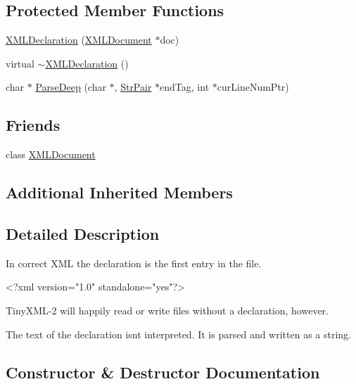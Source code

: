 \subsection*{Protected Member Functions}
\begin{DoxyCompactItemize}
\item 
\hyperlink{classtinyxml2_1_1_x_m_l_declaration_aef9586f2ce5df5feba74dde49a242b06}{X\+M\+L\+Declaration} (\hyperlink{classtinyxml2_1_1_x_m_l_document}{X\+M\+L\+Document} $\ast$doc)
\item 
virtual \hyperlink{classtinyxml2_1_1_x_m_l_declaration_ab93d5bf4f5d58b4144963cf739cf6dcc}{$\sim$\+X\+M\+L\+Declaration} ()
\item 
char $\ast$ \hyperlink{classtinyxml2_1_1_x_m_l_declaration_a9a74a7d55c045d2d183878aaca0082dc}{Parse\+Deep} (char $\ast$, \hyperlink{classtinyxml2_1_1_str_pair}{Str\+Pair} $\ast$end\+Tag, int $\ast$cur\+Line\+Num\+Ptr)
\end{DoxyCompactItemize}
\subsection*{Friends}
\begin{DoxyCompactItemize}
\item 
class \hyperlink{classtinyxml2_1_1_x_m_l_declaration_a4eee3bda60c60a30e4e8cd4ea91c4c6e}{X\+M\+L\+Document}
\end{DoxyCompactItemize}
\subsection*{Additional Inherited Members}


\subsection{Detailed Description}
In correct X\+ML the declaration is the first entry in the file. \begin{DoxyVerb}<?xml version="1.0" standalone="yes"?>
\end{DoxyVerb}


Tiny\+X\+M\+L-\/2 will happily read or write files without a declaration, however.

The text of the declaration isn\textquotesingle{}t interpreted. It is parsed and written as a string. 

\subsection{Constructor \& Destructor Documentation}
\mbox{\label{classtinyxml2_1_1_x_m_l_declaration_aef9586f2ce5df5feba74dde49a242b06}} 
